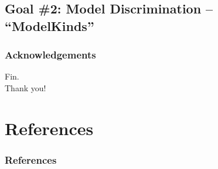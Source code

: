 \documentclass{beamer}
\begin{document}
\subsection{Goal \#2: Model Discrimination -- ``ModelKinds''}



\begin{frame}
    \frametitle{Acknowledgements}
    
\end{frame}


\begin{frame}
    \center
    \huge{Fin.}\\
    \normalsize{Thank you!}
\end{frame}


\section{References}

\begin{frame}[allowframebreaks]
    \frametitle{References}

    
    
\end{frame}
\end{document}
